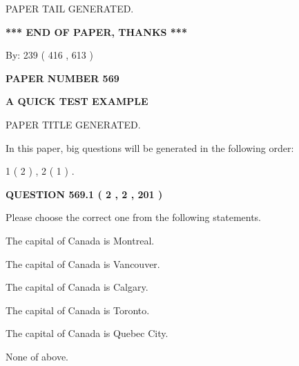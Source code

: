 \documentclass[12pt]{article}
\begin{document}
   
   
\vspace{2.0in} PAPER TAIL GENERATED.
   
   
   
   
\vspace{1.0in} 
{\textbf{\large{ *** END OF PAPER, THANKS *** }}} 
   
   
\hspace{1.0in} By: 
 239 ( 416 ,  613 )
   
   
   
   
\newpage 
\setcounter{page}{ 
   569001 } 
   
   
   
   
 {\textbf{ \Large{ PAPER NUMBER  569  }}}
   
   
\vspace{0.2in}
   
   
   
   
   
   
   
   
 \vspace{0.2in}
{\LARGE {\textbf{ A QUICK TEST EXAMPLE}}}
   
   
 PAPER TITLE GENERATED.
   
   
   
\vspace{0.2in}
   
In this paper, big questions will be generated in the following order: 
   
   
   1 ( 2 )
 ,
   2 ( 1 )
 .
  
\vspace{0.2in}
  
{\textbf{\Large{QUESTION
569.1 
 ( 2 , 2 , 201 )
}}}
  
  
Please choose the correct one from the following statements.
 
 
The capital of Canada is Montreal.
 
 
The capital of Canada is Vancouver.
 
 
The capital of Canada is Calgary.
 
 
The capital of Canada is Toronto.
 
 
The capital of Canada is Quebec City.
 
 
 None of above.
 
\end{document}
